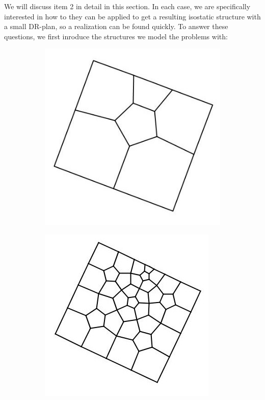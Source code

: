 We will discuss item 2 in detail in this section. In each case, we are specifically interested in how to they can be applied to get a resulting isostatic structure with a small DR-plan, so a realization can be found quickly. To answer these questions, we first inroduce the structures we model the problems with:

\begin{figure}\centering
    \begin{subfigure}{0.25\linewidth}
        \includegraphics[width=\linewidth]{img/pentl1}
    \end{subfigure}
    \begin{subfigure}{0.25\linewidth}
        \includegraphics[width=\linewidth]{img/pentl2}

\end{subfigure}
\end{figure}
